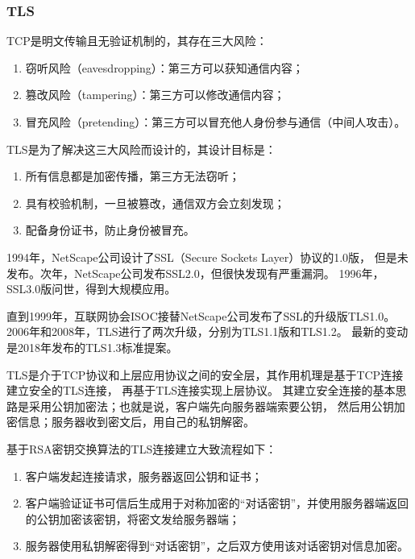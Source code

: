 \subsubsection{TLS}

TCP是明文传输且无验证机制的，其存在三大风险：

\begin{enumerate}
    \item 窃听风险（eavesdropping）：第三方可以获知通信内容；
    \item 篡改风险（tampering）：第三方可以修改通信内容；
    \item 冒充风险（pretending）：第三方可以冒充他人身份参与通信（中间人攻击）。
\end{enumerate}

TLS是为了解决这三大风险而设计的，其设计目标是：

\begin{enumerate}
    \item 所有信息都是加密传播，第三方无法窃听；
    \item 具有校验机制，一旦被篡改，通信双方会立刻发现；
    \item 配备身份证书，防止身份被冒充。
\end{enumerate}

1994年，NetScape公司设计了SSL（Secure Sockets Layer）协议的1.0版，
但是未发布。次年，NetScape公司发布SSL2.0，但很快发现有严重漏洞。
1996年，SSL3.0版问世，得到大规模应用。

直到1999年，互联网协会ISOC接替NetScape公司发布了SSL的升级版TLS1.0。
2006年和2008年，TLS进行了两次升级，分别为TLS1.1版和TLS1.2。
最新的变动是2018年发布的TLS1.3标准提案。

TLS是介于TCP协议和上层应用协议之间的安全层，其作用机理是基于TCP连接建立安全的TLS连接，
再基于TLS连接实现上层协议。
其建立安全连接的基本思路是采用公钥加密法；也就是说，客户端先向服务器端索要公钥，
然后用公钥加密信息；服务器收到密文后，用自己的私钥解密。

基于RSA密钥交换算法\cite{rfc8017}的TLS连接建立大致流程如下：

\begin{enumerate}
    \item 客户端发起连接请求，服务器返回公钥和证书；
    \item 客户端验证证书可信后生成用于对称加密的“对话密钥”，并使用服务器端返回的公钥加密该密钥，将密文发给服务器端；
    \item 服务器使用私钥解密得到“对话密钥”，之后双方使用该对话密钥对信息加密。
\end{enumerate}

